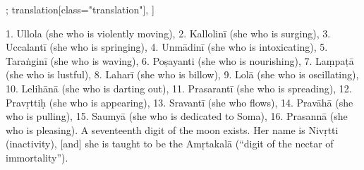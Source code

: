 \begin{alignment}[
  texts=edition[class="edition"];
  translation[class="translation"],
  ]
\begin{translation}
\begin{tlate}[p54_01]
1. Ullola (she who is violently moving), 2. Kallolinī (she who is surging), 3. Uccalantī (she who is springing), 4. Unmādinī (she who is intoxicating), 5. Taraṅginī (she who is waving), 6. Poṣayanti (she who is nourishing), 7. Laṃpaṭā (she who is lustful), 8. Laharī (she who is billow), 9. Lolā (she who is oscillating), 10. Lelihānā (she who is darting out), 11. Prasarantī (she who is spreading), 12. Pravṛttiḥ (she who is appearing), 13. Sravantī (she who flows), 14. Pravāhā (she who is pulling), 15. Saumyā (she who is dedicated to Soma), 16. Prasannā (she who is pleasing). A seventeenth digit of the moon exists. Her name is Nivṛtti (inactivity), [and] she is taught to be the Amṛtakalā (``digit of the nectar of immortality'').
\flushpage
\end{tlate}
  \end{translation}
\end{alignment}
\pagebreak %
